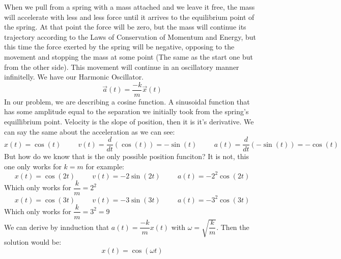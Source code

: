 \documentclass{report}
\begin{document}
      \noindent When we pull from a spring with a mass attached and we leave it free, the mass will accelerate with less and less force until it arrives to the equilibrium point of the spring. At that point the force will be zero, but the mass will continue its trajectory according to the Laws of Conservation of Momentum and Energy,
      but this time the force exerted by the spring will be negative, opposing to the movement and stopping the mass at some point (The same as the start one but from the other side). This movement will continue in an oscillatory manner infinitelly. We have our Harmonic Oscillator.
      \begin{equation}
        \vec{a}(t)=\dfrac{-k}{m}\vec{x}(t)
      \end{equation}
      \noindent In our problem, we are describing a cosine function. A sinusoidal function that has some amplitude equal to the separation we initially took from the spring's equillibrium point. Velocity is the slope of position, then it is it's derivative. We can say the same about the acceleration as we can see:
      \begin{equation}
        x(t)=\cos(t)\hspace{1cm}v(t)=\dfrac{d}{dt}(\cos(t))=-\sin(t)\hspace{1cm}a(t)=\dfrac{d}{dt}(-\sin(t))=-\cos(t)
      \end{equation}
      \noindent But how do we know that is the only possible position funciton? It is not, this one only works for $k=m$ for example:
      \begin{equation}
        x(t)=\cos(2t)\hspace{1cm}v(t)=-2\sin(2t)\hspace{1cm}a(t)=-2^2\cos(2t)
      \end{equation}
      Which only works for $\dfrac{k}{m}=2^2$
      \begin{equation}
        x(t)=\cos(3t)\hspace{1cm}v(t)=-3\sin(3t)\hspace{1cm}a(t)=-3^2\cos(3t)
      \end{equation}
      Which only works for $\dfrac{k}{m}=3^2=9$\\

      \noindent We can derive by innduction that $a(t)=\dfrac{-k}{m}x(t)$ with $\omega=\sqrt{\dfrac{k}{m}}$. Then the solution would be:
      \begin{equation}
        x(t)=\cos(\omega t)
      \end{equation}
\end{document}
